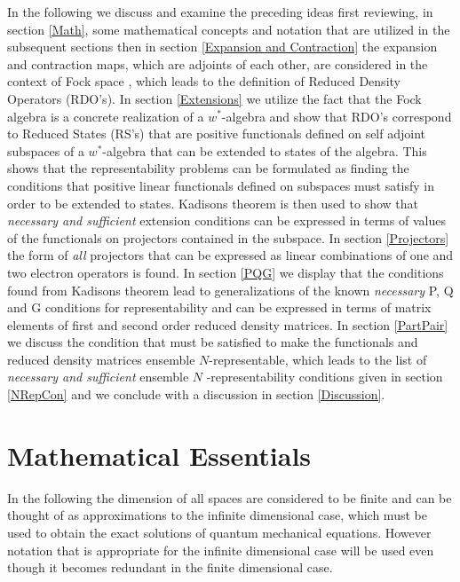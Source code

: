 \documentclass[aps,preprint]{revtex4}%
\begin{document}
In the following we discuss and examine the preceding ideas first reviewing,
in section \ref{Math}, some mathematical concepts and notation that are
utilized in the subsequent sections then in section
\ref{Expansion and Contraction} the expansion and contraction maps, which are
adjoints of each other, are considered in the context of Fock space
\cite{Kummar67,Kummar70}, which leads to the definition of Reduced Density
Operators (RDO's). In section \ref{Extensions} we utilize the fact that the
Fock algebra is a concrete realization of a $w^{\ast}$-algebra and show that
RDO's correspond to Reduced States (RS's) that are positive functionals
defined on self adjoint subspaces of a $w^{\ast}$-algebra that can be extended
to states of the algebra. This shows that the representability problems can be
formulated as finding the conditions that positive linear functionals defined
on subspaces must satisfy in order to be extended to states. Kadisons theorem
is then used to show that \emph{necessary and sufficient }extension conditions
can be expressed in terms of values of the functionals on projectors contained
in the subspace. In section \ref{Projectors} the form of \emph{all }projectors
that can be expressed as linear combinations of one and two electron operators
is found. In section \ref{PQG} we display that the conditions found from
Kadisons theorem lead to generalizations of the known \emph{necessary }P, Q
and G conditions for representability and can be expressed in terms of matrix
elements of first and second order reduced density matrices. In section
\ref{PartPair} we discuss the condition that must be satisfied to make the
functionals and reduced density matrices ensemble $N$-representable, which
leads to the list of \emph{necessary and sufficient }ensemble $N$%
-representability conditions given in section \ref{NRepCon} and we conclude
with a discussion in section \ref{Discussion}.

\section{Mathematical Essentials \label{Math}}

In the following the dimension of all spaces are considered to be finite and
can be thought of as approximations to the infinite dimensional case, which
must be used to obtain the exact solutions of quantum mechanical equations.
However notation that is appropriate for the infinite dimensional case will be
used even though it becomes redundant in the finite dimensional case.
\end{document}
